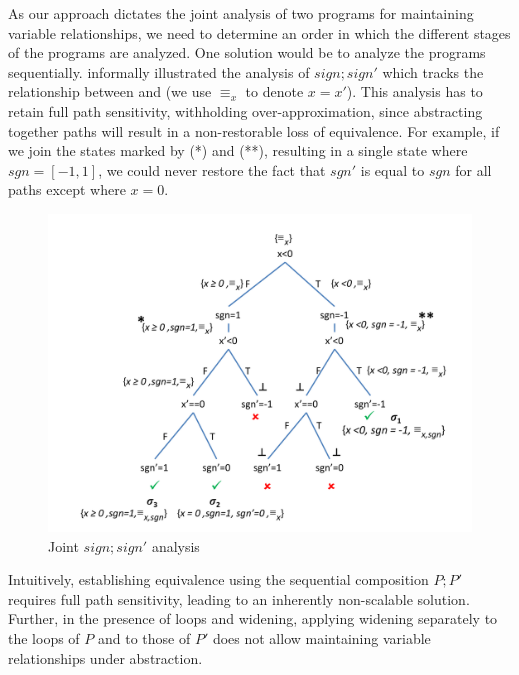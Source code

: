  As our approach dictates the joint analysis of two programs for maintaining variable relationships, we need to determine an order in which the different stages of the programs are analyzed. One solution would be to analyze the programs sequentially.  informally illustrated the analysis of $sign;sign'$ which tracks the relationship between  and  (we use $\equiv_{x}$ to denote $x=x'$). This analysis has to retain full path sensitivity, withholding over-approximation, since abstracting together paths will result in a non-restorable loss of equivalence. For example, if we join the states marked by (*) and (**), resulting in a single state where $sgn = [-1,1]$, we could never restore the fact that $sgn'$ is equal to $sgn$ for all paths except where $x=0$.
\begin{figure}
\centering
\includegraphics[scale=0.38,clip=true,trim = 45pt 15pt 0pt 35pt]{figures/sign-graph-joint}
\caption{Joint $sign;sign'$ analysis}
\end{figure}

Intuitively, establishing equivalence using the sequential composition $P;P'$ requires full path sensitivity, leading to an inherently non-scalable solution. Further, in the presence of loops and widening, applying widening separately to the loops of $P$ and to those of $P'$ does not allow maintaining variable relationships under abstraction.

